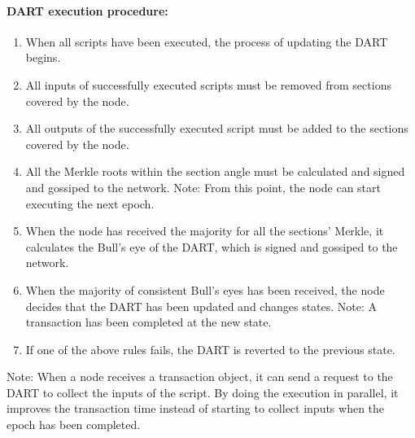 \paragraph{DART execution procedure:}
\begin{enumerate}
 \item 
    When all scripts have been executed, the process of updating the DART begins.
 \item 
    All inputs of successfully executed scripts must be removed from sections covered by the node.
 \item 
    All outputs of the successfully executed script must be added to the sections covered by the node.
 \item 
    All the Merkle roots within the section angle must be calculated and signed and gossiped to the network.
Note: From this point, the node can start executing the next epoch.
 \item 
    When the node has received the majority for all the sections' Merkle, it calculates the Bull's eye of the DART, which is signed and gossiped to the network.
 \item 
    When the majority of consistent Bull's eyes has been received, the node decides that the DART has been updated and changes states. 
Note: A transaction has been completed at the new state.
 \item 
    If one of the above rules fails, the DART is reverted to the previous state.
\end{enumerate}

Note: When a node receives a transaction object, it can send a request to the DART to collect the inputs of the script. By doing the execution in parallel, it improves the transaction time instead of starting to collect inputs when the epoch has been completed.

